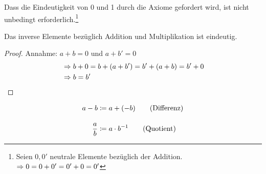 \begin{bemerkung}
    Dass die Eindeutigkeit von 0 und 1 durch die Axiome gefordert wird, ist nicht unbedingt erforderlich.\footnote{Seien $0, 0'$ neutrale Elemente bezüglich der Addition. $\Rightarrow{} 0 = 0+0' = 0'+0=0'$}
\end{bemerkung}

\begin{bemerkung}
    Das inverse Elemente bezüglich Addition und Multiplikation ist eindeutig.
    \begin{proof}
        Annahme: $a+b=0$ und $a+b'=0$
        \begin{align*}
            &\Rightarrow{} b + 0 = b + \left(a+b'\right) = b' + \left(a+b\right) = b' + 0\\
            &\Rightarrow{} b = b'\qedhere
        \end{align*}
    \end{proof}
\end{bemerkung}

\begin{notation}
    \begin{align*}
        a-b &\coloneqq a+(-b)\tag{Differenz}\\[10pt]
        \frac{a}{b} &\coloneqq a \cdot b^{-1}\tag{Quotient}
    \end{align*}
\end{notation}

